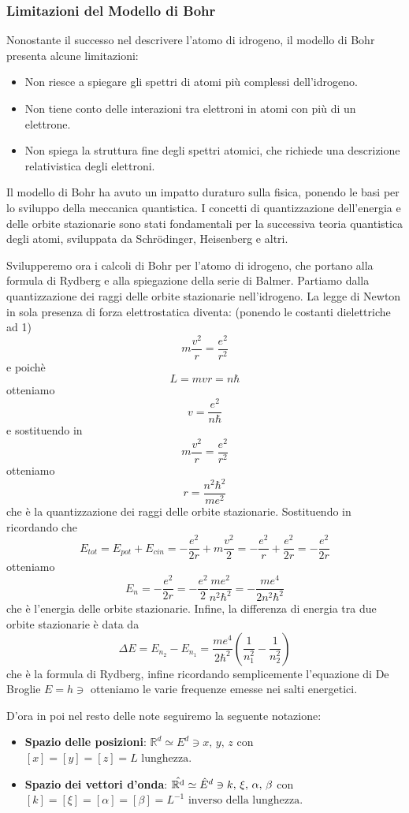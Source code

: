 \subsubsection*{Limitazioni del Modello di Bohr}
Nonostante il successo nel descrivere l'atomo di idrogeno, il modello di Bohr presenta alcune limitazioni:
\begin{itemize}
    \item Non riesce a spiegare gli spettri di atomi più complessi dell'idrogeno.
    \item Non tiene conto delle interazioni tra elettroni in atomi con più di un elettrone.
    \item Non spiega la struttura fine degli spettri atomici, che richiede una descrizione relativistica degli elettroni.
\end{itemize}
Il modello di Bohr ha avuto un impatto duraturo sulla fisica, ponendo le basi per lo sviluppo della meccanica quantistica. I concetti di quantizzazione dell'energia e delle orbite stazionarie sono stati fondamentali per la successiva teoria quantistica degli atomi, sviluppata da Schrödinger, Heisenberg e altri.

Svilupperemo ora i calcoli di Bohr per l'atomo di idrogeno, che portano alla formula di Rydberg e alla spiegazione della serie di Balmer. Partiamo dalla quantizzazione dei raggi delle orbite stazionarie nell'idrogeno. La legge di Newton in sola presenza di forza elettrostatica diventa: (ponendo le costanti dielettriche ad 1) 
$$m\frac{v^2}{r} = \frac{e^2}{r^2}$$e poichè $$L = mvr = n\hbar$$ otteniamo $$v = \frac{e^2}{n\hbar}$$ e sostituendo in $$m\frac{v^2}{r} = \frac{e^2}{r^2}$$ otteniamo $$r = \frac{n^2\hbar^2}{me^2}$$ che è la quantizzazione dei raggi delle orbite stazionarie. Sostituendo in ricordando che $$E_{tot}= E_{pot} + E_{cin} = -\frac{e^2}{2r} +  m \dfrac{v^2}{2} = -\frac{e^2}{r} + \frac{e^2}{2r} = -\frac{e^2}{2r}$$ otteniamo $$E_n = -\frac{e^2}{2r} = -\frac{e^2}{2} \frac{me^2}{n^2\hbar^2} = -\frac{me^4}{2n^2\hbar^2}$$ che è l'energia delle orbite stazionarie. Infine, la differenza di energia tra due orbite stazionarie è data da $$\Delta E = E_{n_2} - E_{n_1} = \frac{me^4}{2\hbar^2} \left( \frac{1}{n_1^2} - \frac{1}{n_2^2} \right)$$ che è la formula di Rydberg, infine ricordando semplicemente l'equazione di De Broglie $E = h \ni$ otteniamo le varie frequenze emesse nei salti energetici. 


D'ora in poi nel resto delle note seguiremo la seguente notazione:
\begin{itemize}
    \item \textbf{Spazio delle posizioni}: $\mathbb{R}^d \simeq E^d \ni x,\, y,\,z$ con $[x] = [y] = [z] = L \text{ lunghezza}$.
    \item \textbf{Spazio dei vettori d'onda}: $\operatorname{\hat{\mathbb{R}^d}}\simeq \hat{E}^d \ni k, \, \xi, \, \alpha , \, \beta$ con $[k] = [ \xi ] = [\alpha] = [\beta] = L^{-1} \text{ inverso della lunghezza}$.
\end{itemize}

